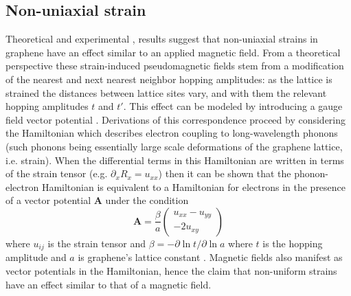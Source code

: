 \documentclass[edeposit,fullpage,draftthesis]{uiucthesis2009}
\begin{document}
        \subsection{Non-uniaxial strain}
        \label{sec:bg:nonuniaxial}
        
        Theoretical \cite{manes2007symmetry, Guinea2009} and experimental \cite{Levy2010}, \cite{Yan2012} 
        results suggest that non-uniaxial strains in graphene have an effect similar to an applied magnetic field. 
        From a theoretical perspective these strain-induced pseudomagnetic fields stem from a modification 
        of the nearest and next nearest neighbor hopping amplitudes: as the lattice is strained the distances 
        between lattice sites vary, and with them the relevant hopping amplitudes $t$ and $t'$. 
        This effect can be modeled by introducing a gauge field vector potential \cite{manes2007symmetry}. 
        Derivations of this correspondence proceed by considering the Hamiltonian which describes
        electron coupling to long-wavelength phonons (such phonons being essentially large scale deformations
        of the graphene lattice, i.e. strain).
        When the differential terms in this Hamiltonian
        are written in terms of the strain tensor (e.g. $\partial_x R_x = u_{xx}$) then it can be shown
        that the phonon-electron Hamiltonian is equivalent to a Hamiltonian for electrons in the presence of
        a vector potential $\textbf{A}$ under the condition
        \begin{equation}
            \textbf{A} = \frac{\beta}{a} \left( \begin{matrix} u_{xx} - u_{yy} \\ -2u_{xy} \end{matrix} \right)
        \end{equation}
        where $u_{ij}$ is the strain tensor and $\beta = -\partial \ln t / \partial \ln a$
        where $t$ is the hopping amplitude and $a$ is graphene's lattice constant \cite{manes2007symmetry}. 
        Magnetic fields also manifest
        as vector potentials in the Hamiltonian, hence the claim that non-uniform strains have an
        effect similar to that of a magnetic field.
        
\end{document}
